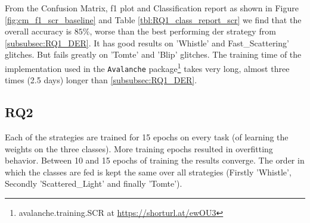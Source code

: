 From the Confusion Matrix, f1 plot and Classification report as shown in Figure \ref{fig:cm_f1_scr_baseline} and Table \ref{tbl:RQ1_class_report_scr} we find that the overall accuracy is $85\%$, worse than the best performing \acrshort{der} strategy from \ref{subsubsec:RQ1_DER}. It has good results on 'Whistle' and Fast\_Scattering' glitches. But fails greatly on 'Tomte' and 'Blip' glitches.
The training time of the implementation used in the \verb|Avalanche| package\footnote{avalanche.training.SCR at  \url{https://shorturl.at/ewOU3}} takes very long, almost three times (2.5 days) longer than \ref{subsubsec:RQ1_DER}. 

\subsection{RQ2}
\label{subsec:RQ2}
Each of the strategies are trained for 15 epochs on every task (of learning the weights on the three classes). More training epochs resulted in overfitting behavior. Between 10 and 15 epochs of training the results converge. The order in which the classes are fed is kept the same over all strategies (Firstly 'Whistle', Secondly 'Scattered\_Light' and finally 'Tomte').

